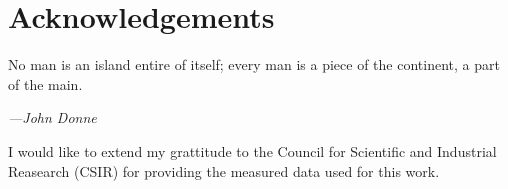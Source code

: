 \documentclass[class=report,11pt,crop=false]{standalone}
\begin{document}
\chapter*{Acknowledgements}
\epigraph{No man is an island entire of itself; every man is a piece of the continent, a part of the main.}%
    {\emph{---John Donne}}
\vspace{0.3cm}

\lipsum[1]




I would like to extend my grattitude to the Council for Scientific and Industrial Reasearch (CSIR) for providing the measured data used for this work.
\end{document}
